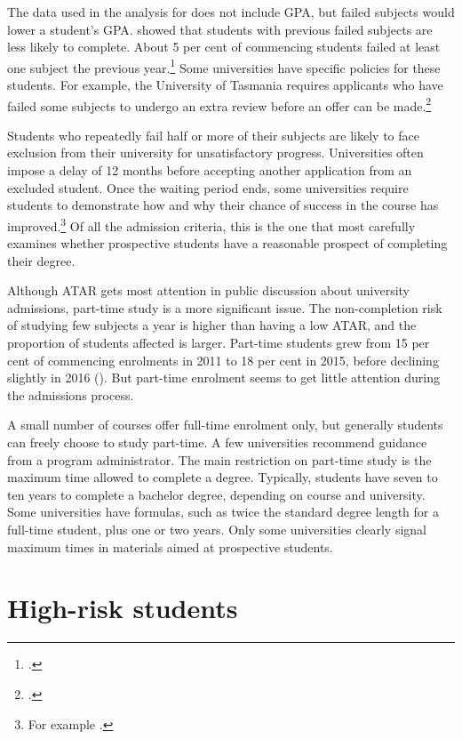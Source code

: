 The data used in the analysis for  does not include GPA, but failed subjects would lower a student's GPA.  showed that students with previous failed subjects are less likely to complete. About 5 per cent of commencing students failed at least one subject the previous year.\footcite{DepartmentofEducationandTraining2017n} 
Some universities have specific policies for these students. For example, the University of Tasmania requires applicants who have failed some subjects to undergo an extra review before an offer can be made.\footcite{UniversityofTasmania2018}

Students who repeatedly fail half or more of their subjects are likely to face exclusion from their university for unsatisfactory progress. Universities often impose a delay of 12 months before accepting another application from an excluded student. Once the waiting period ends, some universities require students to demonstrate how and why their chance of success in the course has improved.\footnote{For example  \textcites[][9]{UTS2016}[][8]{UniversityofMelbourne2017}[][]{Monash}.} 
Of all the admission criteria, this is the one that most carefully examines whether prospective students have a reasonable prospect of completing their degree.


Although ATAR gets most attention in public discussion about university admissions, part-time study is a more significant issue. The non-completion risk of studying few subjects a year is higher than having a low ATAR, and the proportion of students affected is larger. Part-time students grew from 15 per cent of commencing enrolments in 2011 to 18 per cent in 2015, before declining slightly in 2016 (). But part-time enrolment seems to get little attention during the admissions process.

A small number of courses offer full-time enrolment only, but generally students can freely choose to study part-time. A few universities recommend guidance from a program administrator. The main restriction on part-time study is the maximum time allowed to complete a degree. Typically, students have seven to ten years to complete a bachelor degree, depending on course and university. Some universities have formulas, such as twice the standard degree length for a full-time student, plus one or two years. Only some universities clearly signal maximum times in materials aimed at prospective students.

\section{High-risk students}\label{sec:4.3}

